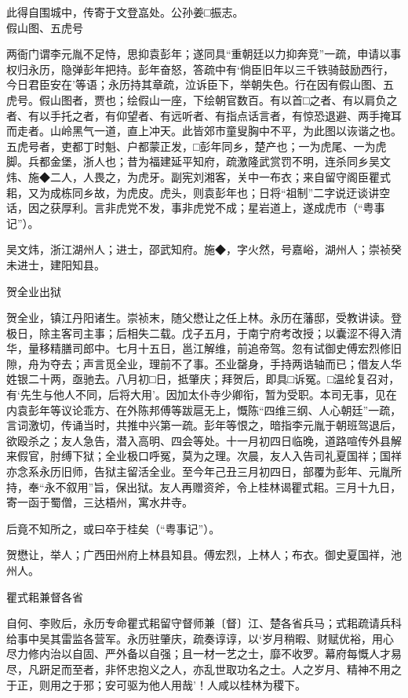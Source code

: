 \documentclass[]{article}
\begin{document}
此得自围城中，传寄于文登嵓处。公孙姜□振志。\\
假山图、五虎号

两衙门谓李元胤不足恃，思抑袁彭年；遂同具``重朝廷以力抑奔竞''一疏，申请以事权归永历，隐弹彭年把持。彭年奋怒，答疏中有`倘臣旧年以三千铁骑鼓励西行，今日君臣安在'等语；永历持其章疏，泣诉臣下，举朝失色。行在因有假山图、五虎号。假山图者，贾也；绘假山一座，下绘朝官数百。有以首□之者、有以肩负之者、有以手托之者，有仰望者、有远听者、有指点话言者，有惊恐退避、两手掩耳而走者。山岭黑气一道，直上冲天。此皆郊市童叟胸中不平，为此图以诙谐之也。五虎号者，吏都丁时魁、户都蒙正发，□彭年同乡，楚产也；一为虎尾、一为虎脚。兵都金堡，浙人也；昔为福建延平知府，疏激隆武赏罚不明，连杀同乡吴文炜、施◆二人，人畏之，为虎牙。副宪刘湘客，关中一布衣；来自留守阁臣瞿式耜，又为成栋同乡故，为虎皮。虎头，则袁彭年也；日将``祖制''二字说迂谈讲空话，因之获厚利。言非虎党不发，事非虎党不成；星岩道上，遂成虎市（``粤事记''）。

吴文炜，浙江湖州人；进士，邵武知府。施◆，字火然，号嘉峪，湖州人；崇祯癸未进士，建阳知县。

贺全业出狱

贺全业，镇江丹阳诸生。崇祯末，随父懋让之任上林。永历在藩邸，受教讲读。登极日，除主客司主事；后相失二载。戊子五月，于南宁府考改授；以囊涩不得入清华，量移精膳司郎中。七月十五日，邕江解维，前追帝驾。忽有试御史傅宏烈修旧隙，舟为夺去；声言觅全业，理前不了事。丕业罄身，手持两诰轴而已；借友人华姓银二十两，亟驰去。八月初□日，抵肇庆；拜贺后，即具□诉冤。□温纶复召对，有`先生与他人不同，后将大用'。因加太仆寺少卿衔，暂为受职。本司无事，见在内袁彭年等议论乖方、在外陈邦傅等跋扈无上，慨陈``四维三纲、人心朝廷''一疏，言词激切，传诵当时，共推中兴第一疏。彭年等恨之，暗指李元胤于朝班驾退后，欲殴杀之；友人急告，潜入高明、四会等处。十一月初四日临晚，道路喧传外县解来假官，肘缚下狱；全业极口呼冤，莫为之理。次晨，友人入告司礼夏国祥；国祥亦念系永历旧师，告狱主留活全业。至今年己丑三月初四日，部覆为彭年、元胤所持，奉``永不叙用''旨，保出狱。友人再赠资斧，令上桂林谒瞿式耜。三月十九日，寄一函于蜀僧，三达梧州，寓水井寺。

后竟不知所之，或曰卒于桂矣（``粤事记''）。

贺懋让，举人；广西田州府上林县知县。傅宏烈，上林人；布衣。御史夏国祥，池州人。

瞿式耜兼督各省

自何、李败后，永历专命瞿式耜留守督师兼〔督〕江、楚各省兵马；式耜疏请兵科给事中吴其雷监各营军。永历驻肇庆，疏奏谆谆，以`岁月稍暇、财赋优裕，用心尽力修内治以自固、严外备以自强；且一材一艺之士，靡不收罗。幕府每慨人才易尽，凡趼足而至者，非怀忠抱义之人，亦乱世取功名之士。人之岁月、精神不用之于正，则用之于邪；安可驱为他人用哉'！人咸以桂林为稷下。
\end{document}
